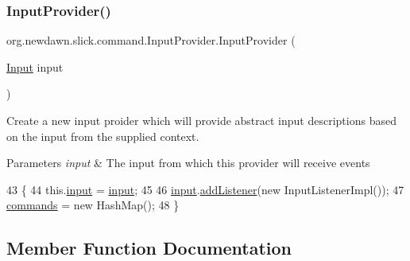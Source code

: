 \subsubsection{\texorpdfstring{Input\+Provider()}{InputProvider()}}
{\footnotesize\ttfamily org.\+newdawn.\+slick.\+command.\+Input\+Provider.\+Input\+Provider (\begin{DoxyParamCaption}\item[{\mbox{\hyperlink{classorg_1_1newdawn_1_1slick_1_1_input}{Input}}}]{input }\end{DoxyParamCaption})\hspace{0.3cm}{\ttfamily [inline]}}

Create a new input proider which will provide abstract input descriptions based on the input from the supplied context.


\begin{DoxyParams}{Parameters}
{\em input} & The input from which this provider will receive events \\
\hline
\end{DoxyParams}

\begin{DoxyCode}
43                                       \{
44         this.\mbox{\hyperlink{classorg_1_1newdawn_1_1slick_1_1command_1_1_input_provider_a7a9d7954c539d61bd8623da41c199d74}{input}} = \mbox{\hyperlink{classorg_1_1newdawn_1_1slick_1_1command_1_1_input_provider_a7a9d7954c539d61bd8623da41c199d74}{input}};
45 
46         \mbox{\hyperlink{classorg_1_1newdawn_1_1slick_1_1command_1_1_input_provider_a7a9d7954c539d61bd8623da41c199d74}{input}}.\mbox{\hyperlink{classorg_1_1newdawn_1_1slick_1_1_input_a281147c97d575c9a5a69004f31fcd596}{addListener}}(\textcolor{keyword}{new} InputListenerImpl());
47         \mbox{\hyperlink{classorg_1_1newdawn_1_1slick_1_1command_1_1_input_provider_ab2bd0c08506a59bc7457d7a87cf873d2}{commands}} = \textcolor{keyword}{new} HashMap();
48     \}
\end{DoxyCode}


\subsection{Member Function Documentation}
\mbox{\label{classorg_1_1newdawn_1_1slick_1_1command_1_1_input_provider_a1170cd03e9cb6062346408e77ddc686e}} 
